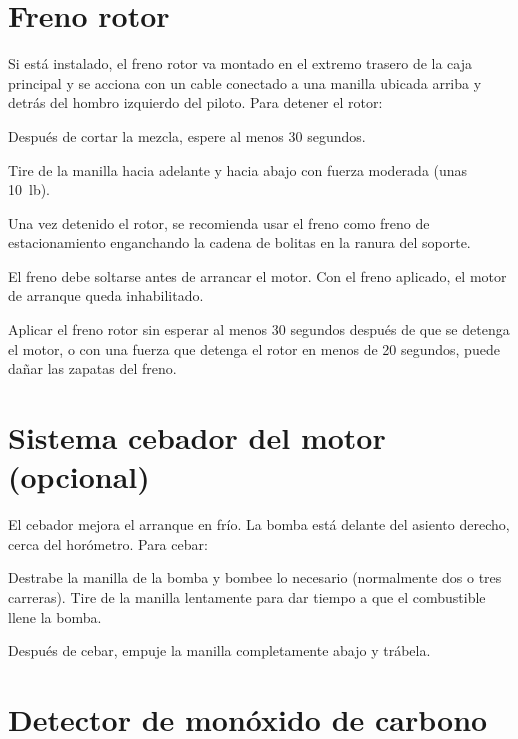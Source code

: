 \section{Freno rotor}

Si está instalado, el freno rotor va montado en el extremo trasero de la caja principal y se acciona con un cable conectado a una manilla ubicada arriba y detrás del hombro izquierdo del piloto. Para detener el rotor:

\begin{pasos}
\item Después de cortar la mezcla, espere al menos 30 segundos.
\item Tire de la manilla hacia adelante y hacia abajo con fuerza moderada (unas 10~lb).
\item Una vez detenido el rotor, se recomienda usar el freno como freno de estacionamiento enganchando la cadena de bolitas en la ranura del soporte.
\end{pasos}

El freno debe soltarse antes de arrancar el motor. Con el freno aplicado, el motor de arranque queda inhabilitado.

\begin{precaucion}
Aplicar el freno rotor sin esperar al menos 30 segundos después de que se detenga el motor, o con una fuerza que detenga el rotor en menos de 20 segundos, puede dañar las zapatas del freno.
\end{precaucion}

\section{Sistema cebador del motor (opcional)}

El cebador mejora el arranque en frío. La bomba está delante del asiento derecho, cerca del horómetro. Para cebar:

\begin{pasos}
\item Destrabe la manilla de la bomba y bombee lo necesario (normalmente dos o tres carreras). Tire de la manilla lentamente para dar tiempo a que el combustible llene la bomba.
\item Después de cebar, empuje la manilla completamente abajo y trábela.
\end{pasos}

\section{Detector de monóxido de carbono}

